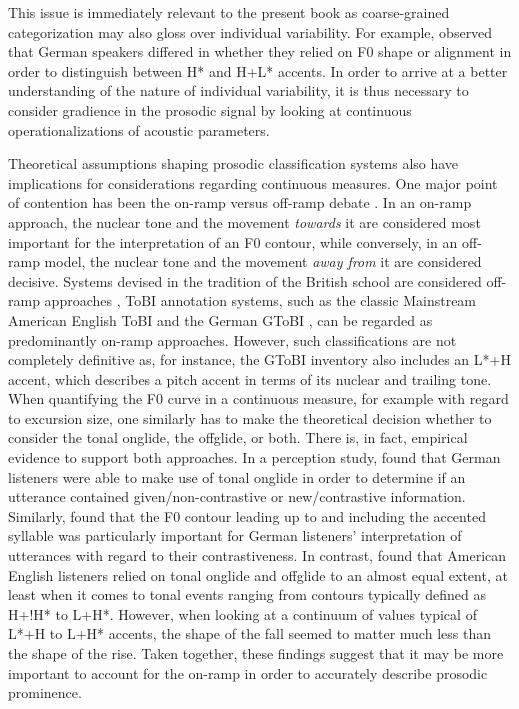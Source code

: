 This issue is immediately relevant to the present book as coarse-grained categorization may also gloss over individual variability. For example, \citet{niebuhrAreThereShapers2011} observed that German speakers differed in whether they relied on F0 shape or alignment in order to distinguish between H* and H+L* accents. In order to arrive at a better understanding of the nature of individual variability, it is thus necessary to consider gradience in the prosodic signal by looking at continuous operationalizations of acoustic parameters.

Theoretical assumptions shaping prosodic classification systems also have implications for considerations regarding continuous measures. One major point of contention has been the on-ramp versus off-ramp debate \citep[see][]{gussenhovenPhonologyToneIntonation2004, ritterRoleTonalOnglides2015, barnesRampsIntonationalPhonology2021}. In an on-ramp approach, the nuclear tone and the movement \textit{towards} it are considered most important for the interpretation of an F0 contour, while conversely, in an off-ramp model, the nuclear tone and the movement \textit{away from} it are considered decisive. Systems devised in the tradition of the British school are considered off-ramp approaches \citep[e.g.,][]{gussenhovenTranscriptionDutchIntonation2005, petersPhonologicalSemanticAspects2018}, ToBI annotation systems, such as the classic Mainstream American English ToBI \citep{silvermanTOBIStandardLabeling1992,beckmanOriginalToBiSystem2005} and the German GToBI \citep{griceConsistencyTranscriptionLabelling1996, griceDeutscheIntonationUnd2002}, can be regarded as predominantly on-ramp approaches. However, such classifications are not completely definitive as, for instance, the GToBI inventory also includes an L*+H accent, which describes a pitch accent in terms of its nuclear and trailing tone. When quantifying the F0 curve in a continuous measure, for example with regard to excursion size, one similarly has to make the theoretical decision whether to consider the tonal onglide, the offglide, or both. There is, in fact, empirical evidence to support both approaches. In a perception study, \citet{ritterRoleTonalOnglides2015} found that German listeners were able to make use of tonal onglide in order to determine if an utterance contained given/non-contrastive or new/contrastive information. Similarly, \citet{braunPrenuclearActivatesAlternatives2019} found that the F0 contour leading up to and including the accented syllable was particularly important for German listeners' interpretation of utterances with regard to their contrastiveness. In contrast, \citet{barnesRampsIntonationalPhonology2021} found that American English listeners relied on tonal onglide and offglide to an almost equal extent, at least when it comes to tonal events ranging from contours typically defined as H+!H* to L+H*. However, when looking at a continuum of values typical of L*+H to L+H* accents, the shape of the fall seemed to matter much less than the shape of the rise. Taken together, these findings suggest that it may be more important to account for the on-ramp in order to accurately describe prosodic prominence.

